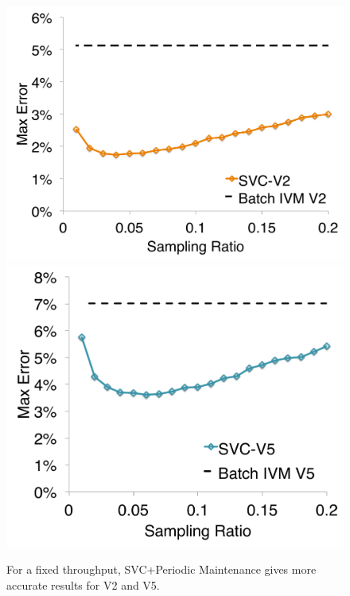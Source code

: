 \begin{figure}[t]
\centering
 \includegraphics[scale=0.14]{exp/con_5.pdf}
 \includegraphics[scale=0.14]{exp/con_6.pdf}
 \caption{For a fixed throughput, SVC+Periodic Maintenance gives more accurate results for V2 and V5. \label{conv-4}} 
\end{figure}

